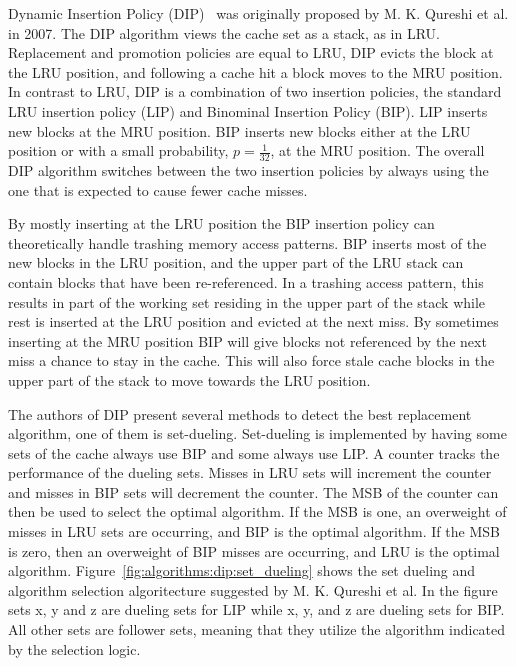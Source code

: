 Dynamic Insertion Policy (DIP)~\cite{Qureshi2007} was originally proposed by M. K. Qureshi et al. in 2007.
The DIP algorithm views the cache set as a stack, as in LRU.
Replacement and promotion policies are equal to LRU, DIP evicts the block at the LRU position, and following a cache hit a block moves to the MRU position.
In contrast to LRU, DIP is a combination of two insertion policies, the standard LRU insertion policy (LIP) and Binominal Insertion Policy (BIP).
LIP inserts new blocks at the MRU position.
BIP inserts new blocks either at the LRU position or with a small probability, $p = \frac{1}{32}$, at the MRU position. 
The overall DIP algorithm switches between the two insertion policies by always using the one that is expected to cause fewer cache misses.

By mostly inserting at the LRU position the BIP insertion policy can theoretically handle trashing memory access patterns.
BIP inserts most of the new blocks in the LRU position, and the upper part of the LRU stack can contain blocks that have been re-referenced.
In a trashing access pattern, this results in part of the working set residing in the upper part of the stack while rest is inserted at the LRU position and evicted at the next miss.
By sometimes inserting at the MRU position BIP will give blocks not referenced by the next miss a chance to stay in the cache. 
This will also force stale cache blocks in the upper part of the stack to move towards the LRU position.

The authors of DIP present several methods to detect the best replacement algorithm, one of them is set-dueling.
Set-dueling is implemented by having some sets of the cache always use BIP and some always use LIP.
A counter tracks the performance of the dueling sets.
Misses in LRU sets will increment the counter and misses in BIP sets will decrement the counter.
The MSB of the counter can then be used to select the optimal algorithm.
If the MSB is one, an overweight of misses in LRU sets are occurring, and BIP is the optimal algorithm. 
If the MSB is zero, then an overweight of BIP misses are occurring, and LRU is the optimal algorithm.
Figure~\ref{fig:algorithms:dip:set_dueling} shows the set dueling and algorithm selection algoritecture suggested by M. K. Qureshi et al.
In the figure sets x, y and z are dueling sets for LIP while x, y, and z are dueling sets for BIP.
All other sets are follower sets, meaning that they utilize the algorithm indicated by the selection logic.

